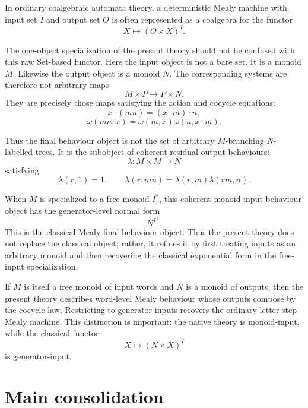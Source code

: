 In ordinary coalgebraic automata theory, a deterministic Mealy machine with
input set \(I\) and output set \(O\) is often represented as a coalgebra for
the functor
\[
X\mapsto (O\times X)^I.
\]

The one-object specialization of the present theory should not be confused
with this raw Set-based functor. Here the input object is not a bare set. It
is a monoid \(M\). Likewise the output object is a monoid \(N\). The
corresponding systems are therefore not arbitrary maps
\[
M\times P\to P\times N.
\]
They are precisely those maps satisfying the action and cocycle equations:
\[
x\cdot(mn)=(x\cdot m)\cdot n,
\]
\[
\omega(mn,x)=\omega(m,x)\omega(n,x\cdot m).
\]

Thus the final behaviour object is not the set of arbitrary \(M\)-branching
\(N\)-labelled trees. It is the subobject of coherent residual-output
behaviours:
\[
\lambda:M\times M\to N
\]
satisfying
\[
\lambda(r,1)=1,
\qquad
\lambda(r,mn)=\lambda(r,m)\lambda(rm,n).
\]

When \(M\) is specialized to a free monoid \(I^\ast\), this coherent
monoid-input behaviour object has the generator-level normal form
\[
N^{I^+}.
\]
This is the classical Mealy final-behaviour object. Thus the present theory
does not replace the classical object; rather, it refines it by first treating
inputs as an arbitrary monoid and then recovering the classical exponential
form in the free-input specialization.

\begin{remark}
\label{rem:raw-versus-monoid-input}
If \(M\) is itself a free monoid of input words and \(N\) is a monoid of
outputs, then the present theory describes word-level Mealy behaviour whose
outputs compose by the cocycle law. Restricting to generator inputs recovers
the ordinary letter-step Mealy machine. This distinction is important: the
native theory is monoid-input, while the classical functor
\[
X\mapsto (N\times X)^I
\]
is generator-input.
\end{remark}

\section{Main consolidation}
\label{sec:mealy-comonad-main-consolidation}


